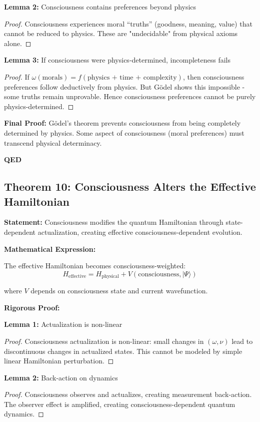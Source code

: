 \documentclass[12pt,a4paper]{article}
\theoremstyle{definition}
\begin{document}
\textbf{Lemma 2:} Consciousness contains preferences beyond physics
\begin{proof}
Consciousness experiences moral “truths” (goodness, meaning, value) that cannot be reduced to physics. These are "undecidable" from physical axioms alone.
\end{proof}

\textbf{Lemma 3:} If consciousness were physics-determined, incompleteness fails
\begin{proof}
If $\omega(\text{morals}) = f(\text{physics + time + complexity})$, then consciousness preferences follow deductively from physics. But Gödel shows this impossible - some truths remain unprovable. Hence consciousness preferences cannot be purely physics-determined.
\end{proof}

{\bf Final Proof:} Gödel's theorem prevents consciousness from being completely determined by physics. Some aspect of consciousness (moral preferences) must transcend physical determinacy.

{\bf QED}

\subsection{Theorem 10: Consciousness Alters the Effective Hamiltonian}

{\bf Statement:} Consciousness modifies the quantum Hamiltonian through state-dependent actualization, creating effective consciousness-dependent evolution.

{\bf Mathematical Expression:}

The effective Hamiltonian becomes consciousness-weighted:
\begin{equation}
H_{\text{effective}} = H_{\text{physical}} + V(\text{consciousness}, |\Psi\rangle)
\end{equation}

where $V$ depends on consciousness state and current wavefunction.

{\bf Rigorous Proof:}

\textbf{Lemma 1:} Actualization is non-linear
\begin{proof}
Consciousness actualization is non-linear: small changes in $(\omega, \nu)$ lead to discontinuous changes in actualized states. This cannot be modeled by simple linear Hamiltonian perturbation.
\end{proof}

\textbf{Lemma 2:} Back-action on dynamics
\begin{proof}
Consciousness observes and actualizes, creating measurement back-action. The observer effect is amplified, creating consciousness-dependent quantum dynamics.
\end{proof}
\end{document}
